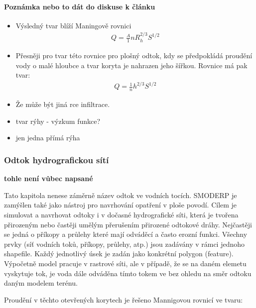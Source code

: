 




\paragraph{Poznámka nebo to dát do diskuse k článku} 
\begin{itemize}
\item Výsledný tvar blíží Maningově rovnici
\begin{eqnarray}
Q =\frac A {1}{n} R_{h}^{2/3} S^{1/2}
\end{eqnarray}
\item Přesněji pro tvar této rovnice pro plošný odtok, kdy se předpokládá proudění vody  o malé hloubce a tvar koryta je nahrazen jeho šířkou. Rovnice má pak tvar:
\begin{eqnarray}
Q =\frac {1}{n} h^{2/3} S^{1/2}
\end{eqnarray}
\item Že může být jiná rce infiltrace.
\item tvar rýhy - výzkum funkce?
\item jen jedna přímá rýha
\end{itemize}

\subsubsection{Odtok hydrografickou sítí} \label{sec:tokyodtok}
\textbf{tohle není vůbec napsané}

Tato kapitola nenese záměrně název odtok ve vodních tocích. SMODERP je zamýšlen také jako nástroj pro navrhování opatření v ploše povodí. Cílem je simulovat a navrhovat odtoky i v dočasné hydrografické síti, která je tvořena přirozeným nebo častěji umělým přerušením přirozené odtokové dráhy. Nejčastěji se jedná o příkopy a průlehy které mají odváděcí a často erozní funkci. 
Všechny prvky (síť vodních toků, příkopy, průlehy, atp.) jsou zadávány v rámci jednoho shapefile. Každý jednotlivý úsek je zadán jako konkrétní polygon (feature). Výpočetně model pracuje v rastrové síti, ale v případě, že se na daném elemetu vyskytuje tok, je voda dále odváděna tímto tokem ve bez ohledu na směr odtoku daným modelem terénu.

Proudění v těchto otevřených korytech je řešeno Mannigovou rovnicí ve tvaru:

